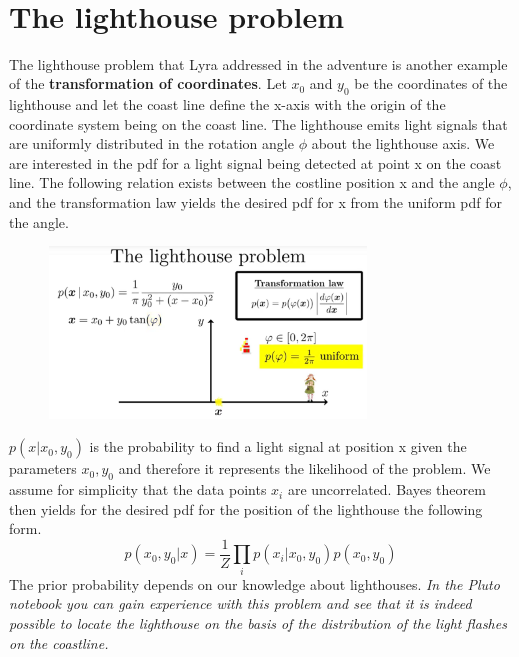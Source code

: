 \documentclass[12pt, a4paper]{scrartcl}
\begin{document}
\\


\section*{The lighthouse problem}
The lighthouse problem that Lyra addressed in the adventure is another
example of the  \textbf{transformation of coordinates}. Let $x_0$ and $y_0$ be the coordinates
of the lighthouse and let the coast line deﬁne the x-axis with the origin of
the coordinate system being on the coast line.
The lighthouse emits light signals that are uniformly distributed in the rotation angle $\phi$ about the lighthouse axis. We are interested in the pdf for a
light signal being detected at point x on the coast line.
The following relation exists between the costline position x and the
angle $\phi$, and the transformation law yields the desired pdf for x from the uniform pdf for
the angle.\\ %
 \begin{figure}[H]
	\centering
	\includegraphics[width=0.75\textwidth]{8_10.png}
\end{figure}

$p(x|x_0,y_0)$ is the probability to ﬁnd a light signal at position x given the parameters
$x_0,y_0$ and therefore it represents the likelihood of the problem.
We assume for simplicity that the data points $x_i$ are uncorrelated. Bayes
theorem then yields for the desired pdf for the position of the lighthouse the following form.
\[p(x_0,y_0|x)=\frac 1Z \prod_i p(x_i|x_0,y_0)p(x_0,y_0)\]
The prior probability depends on our knowledge about lighthouses.
\textit{In the Pluto notebook you can gain experience with this problem and see that
it is indeed possible to locate the lighthouse on the basis of the distribution
of the light ﬂashes on the coastline.}
\end{document}

